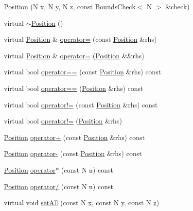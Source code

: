 \begin{DoxyCompactItemize}
\item 
\hyperlink{struct_position_ae82fce224d7ef1599321a94b0a6f0cee}{Position} (N \hyperlink{struct_position_af908be922fc88d89d81be7d08d06f761}{x}, N \hyperlink{struct_position_af434f54a0aad8bbfc3806ebdd197aa3b}{y}, N \hyperlink{struct_position_ac430da98504c2d4fd685c0363d728474}{z}, const \hyperlink{struct_bounds_check}{Bounds\-Check}$<$ N $>$ \&check)
\item 
virtual \hyperlink{struct_position_a21a4e620b847f606fe2e1c5244f0f78e}{$\sim$\-Position} ()
\item 
virtual \hyperlink{struct_position}{Position} \& \hyperlink{struct_position_a669073574ecd196d45ea9d2ff0e3cced}{operator=} (const \hyperlink{struct_position}{Position} \&rhs)
\item 
virtual \hyperlink{struct_position}{Position} \& \hyperlink{struct_position_a580451251fc288d806524683fc85550a}{operator=} (\hyperlink{struct_position}{Position} \&\&rhs)
\item 
virtual bool \hyperlink{struct_position_ac895fed24f992ab43913207bd5fb7048}{operator==} (const \hyperlink{struct_position}{Position} \&rhs) const 
\item 
virtual bool \hyperlink{struct_position_a41b600238d7f4b174ed2c7dcd1ff8214}{operator==} (\hyperlink{struct_position}{Position} \&rhs) const 
\item 
virtual bool \hyperlink{struct_position_a4be02284917613eaa574c3ebbbbbfcb8}{operator!=} (const \hyperlink{struct_position}{Position} \&rhs) const 
\item 
virtual bool \hyperlink{struct_position_acaf1ee869c4bee9e4a6b152eee96efda}{operator!=} (\hyperlink{struct_position}{Position} \&rhs)
\item 
\hyperlink{struct_position}{Position} \hyperlink{struct_position_acee225b72b18e2468a8015fe3585958e}{operator+} (const \hyperlink{struct_position}{Position} \&rhs) const 
\item 
\hyperlink{struct_position}{Position} \hyperlink{struct_position_adc25e016e77688fabb733febd70dc3da}{operator-\/} (const \hyperlink{struct_position}{Position} \&rhs) const 
\item 
\hyperlink{struct_position}{Position} \hyperlink{struct_position_a95f98be024d028f87681c12092afcb28}{operator$\ast$} (const N n) const 
\item 
\hyperlink{struct_position}{Position} \hyperlink{struct_position_a51bc2b1d3ba86057fc8605208d2fb4cf}{operator/} (const N n) const 
\item 
virtual void \hyperlink{struct_position_af6cf3e9c2a535e8d988739e075ca76c1}{set\-All} (const N \hyperlink{struct_position_af908be922fc88d89d81be7d08d06f761}{x}, const N \hyperlink{struct_position_af434f54a0aad8bbfc3806ebdd197aa3b}{y}, const N \hyperlink{struct_position_ac430da98504c2d4fd685c0363d728474}{z})

\end{DoxyCompactItemize}
